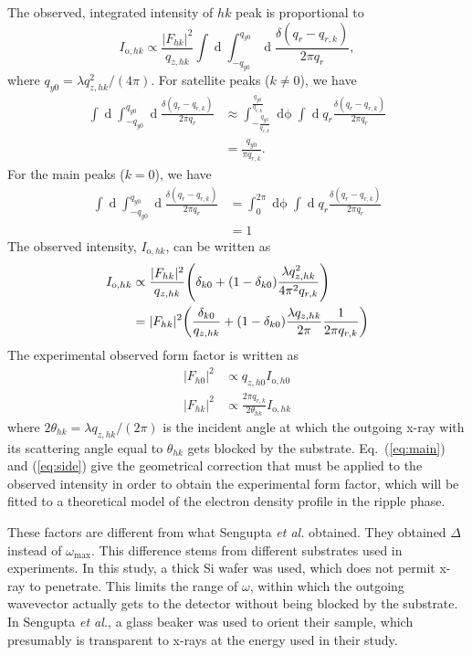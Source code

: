 \documentclass[12pt,letterpaper]{article}
\begin{document}
The observed, integrated intensity of $hk$ peak is proportional to
\begin{equation}
  I_{\mathrm{o},hk} 
    \propto \frac{\lvert F_{hk} \rvert^2}{q_{z,hk}} \int\mathop{dq_x} 
            \int_{-q_{y0}}^{q_{y0}}
            \mathop{dq_y} \frac{\delta(q_r-q_{r,k})}{2\pi q_r},
\end{equation}
where $q_{y0} = \lambda q_{z,hk}^2/(4\pi)$.
For satellite peaks ($k \neq 0$), we have 
\begin{align}
  \int\mathop{dq_x} \int_{-q_{y0}}^{q_{y0}}\mathop{dq_y} \frac{\delta(q_r-q_{r,k})}{2\pi q_r}
  &\approx \int_{-\frac{q_{y0}}{q_{r,k}}}^{\frac{q_{y0}}{q_{r,k}}} \mathop{d\phi} 
          \int \mathop{dq_r} q_r\frac{\delta(q_r-q_{r,k})}{2\pi q_r} \\
 &= \frac{q_{y0}}{\pi q_{r,k}}.
\end{align}
For the main peaks ($k=0$), we have 
\begin{align}
  \int\mathop{dq_x} \int_{-q_{y0}}^{q_{y0}}\mathop{dq_y} \frac{\delta(q_r-q_{r,k})}{2\pi q_r}
  &= \int_0^{2\pi}\mathop{d\phi} \int\mathop{dq_r} q_r\frac{\delta(q_r-q_{r,k})}{2\pi q_r} \\
  &= 1
\end{align}
The observed intensity, $I_{\mathrm{o},hk}$, can be written as
\begin{align}
  I_{\mathrm{o},hk} &\propto \frac{|F_{hk}|^2}{q_{z,hk}}
                    \mathopen{}\left( \delta_{k0}+(1-\delta_{k0})\frac{\lambda q_{z,hk}^2}{4\pi^2 q_{r,k}} \right)\mathclose{} \\
  &= |F_{hk}|^2 \mathopen{}\left( \frac{\delta_{k0}}{q_{z,hk}}+(1-\delta_{k0})\frac{\lambda q_{z,hk}}{2\pi}
  \frac{1}{2\pi q_{r,k}} \right)\mathclose{}
\end{align}
The experimental observed form factor is written as 
\begin{align}
  |F_{h0}|^2 &\propto q_{z,h0} I_{\mathrm{o},h0} \label{eq:main}\\
  |F_{hk}|^2 &\propto \frac{2\pi q_{r,k}}{2\theta_{hk}} I_{\mathrm{o},hk} \label{eq:side} 
\end{align}
where $2\theta_{hk} = \lambda q_{z,hk}/(2\pi)$ is the incident angle at which 
the outgoing x-ray with its scattering angle equal to $\theta_{hk}$ gets 
blocked by the substrate. Eq.~(\ref{eq:main}) and (\ref{eq:side}) give the 
geometrical correction that must be applied to the observed intensity
in order to obtain the experimental form factor, which will be fitted to
a theoretical model of the electron density profile in the ripple phase. 

These factors are different from what Sengupta \textit{et al.} obtained. They
obtained $\Delta$ instead of $\omega_{\text{max}}$. This difference stems from
different substrates used in experiments. In this study, a thick Si wafer
was used, which does not permit x-ray to penetrate. This limits the range
of $\omega$, within which the outgoing wavevector actually gets to the
detector without being blocked by the substrate. In Sengupta \textit{et al.},
a glass beaker was used to orient their sample, which presumably is
transparent to x-rays at the energy used in their study. 
\end{document}
